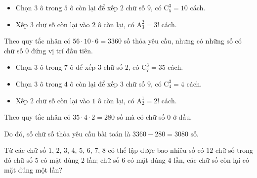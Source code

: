 \begin{bt}
{\begin{listEX}
\begin{description}
\begin{itemize}
					\item Chọn $3$ ô trong $5$ ô còn lại để xếp $2$ chữ số $9$,
					có $\mathrm{C}_5^3=10$ cách.
					\item Xếp $3$ chữ số còn lại vào $2$ ô còn lại, có
					$\mathrm{A}_3^2=3!$ cách.
				\end{itemize}
				Theo quy tắc nhân có $56\cdot 10\cdot 6=3360$ số thỏa yêu cầu, nhưng có những số có chữ số $0$ đứng vị trí đầu tiên.
				\item [Trường hợp số $0$ ở ô đầu tiên.]
				\begin{itemize}
					\item Chọn $3$ ô trong $7$ ô để xếp $3$ chữ số $2$, có $\mathrm{C}_7^3=35$ cách.
					\item Chọn $3$ ô trong $4$ ô còn lại để xếp $3$ chữ số $9$,
					có $\mathrm{C}_4^3=4$ cách.
					\item Xếp $2$ chữ số còn lại vào $1$ ô còn lại, có
					$\mathrm{A}_2^1=2!$ cách.
				\end{itemize}
				Theo quy tắc nhân có $35\cdot 4\cdot 2=280$ số mà có chữ số $0$ ở đầu.
			\end{description}
			Do đó, số chữ số thỏa yêu cầu bài toán là $3360-280=3080$ số.
	\end{listEX}}
\end{bt}
\begin{bt}%
	Từ các chữ số $1$, $2$, $3$, $4$, $5$, $6$, $7$, $8$ có thể lập được bao nhiêu số có $12$ chữ số trong đó chữ số $5$ có mặt đúng $2$ lần; chữ số $6$ có mặt đúng $4$ lần, các chữ số còn lại có mặt đúng một lần?
\end{bt}
